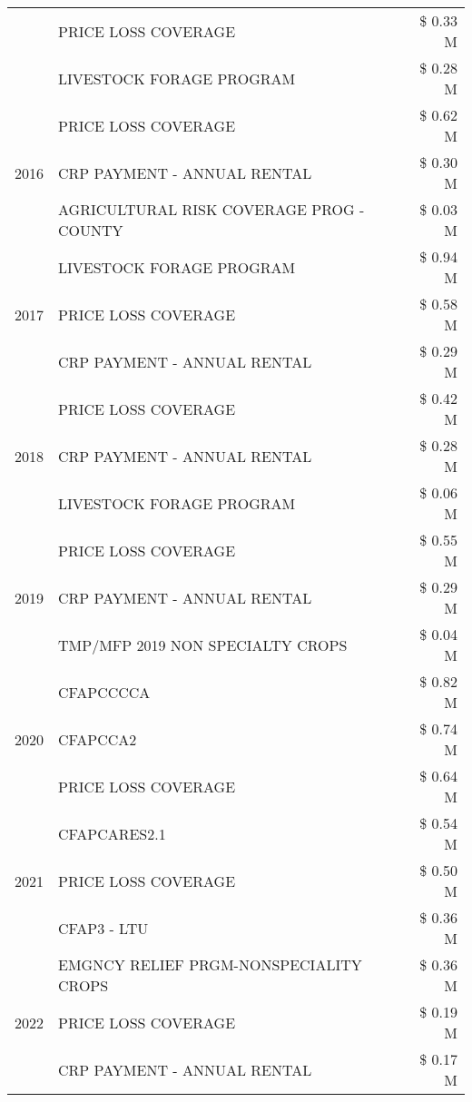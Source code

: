 \begin{tabular}{llr}
 & PRICE LOSS COVERAGE & \$ 0.33 M \\
 & LIVESTOCK FORAGE PROGRAM & \$ 0.28 M \\
\cline{1-3}
\multirow[t]{3}{*}{2016} & PRICE LOSS COVERAGE & \$ 0.62 M \\
 & CRP PAYMENT - ANNUAL RENTAL & \$ 0.30 M \\
 & AGRICULTURAL RISK COVERAGE PROG - COUNTY & \$ 0.03 M \\
\cline{1-3}
\multirow[t]{3}{*}{2017} & LIVESTOCK FORAGE PROGRAM & \$ 0.94 M \\
 & PRICE LOSS COVERAGE & \$ 0.58 M \\
 & CRP PAYMENT - ANNUAL RENTAL & \$ 0.29 M \\
\cline{1-3}
\multirow[t]{3}{*}{2018} & PRICE LOSS COVERAGE & \$ 0.42 M \\
 & CRP PAYMENT - ANNUAL RENTAL & \$ 0.28 M \\
 & LIVESTOCK FORAGE PROGRAM & \$ 0.06 M \\
\cline{1-3}
\multirow[t]{3}{*}{2019} & PRICE LOSS COVERAGE & \$ 0.55 M \\
 & CRP PAYMENT - ANNUAL RENTAL & \$ 0.29 M \\
 & TMP/MFP 2019 NON SPECIALTY CROPS & \$ 0.04 M \\
\cline{1-3}
\multirow[t]{3}{*}{2020} & CFAPCCCCA & \$ 0.82 M \\
 & CFAPCCA2 & \$ 0.74 M \\
 & PRICE LOSS COVERAGE & \$ 0.64 M \\
\cline{1-3}
\multirow[t]{3}{*}{2021} & CFAPCARES2.1 & \$ 0.54 M \\
 & PRICE LOSS COVERAGE & \$ 0.50 M \\
 & CFAP3 - LTU & \$ 0.36 M \\
\cline{1-3}
\multirow[t]{3}{*}{2022} & EMGNCY RELIEF PRGM-NONSPECIALITY CROPS & \$ 0.36 M \\
 & PRICE LOSS COVERAGE & \$ 0.19 M \\
 & CRP PAYMENT - ANNUAL RENTAL & \$ 0.17 M \\
\cline{1-3}
\bottomrule
\end{tabular}
